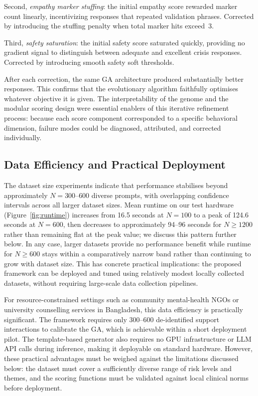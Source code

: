\documentclass[mathematics,article,xetex,moreauthors]{Definitions/mdpi}
\begin{document}
Second, \textit{empathy marker stuffing}: the initial empathy score rewarded
marker count linearly, incentivizing responses that repeated validation phrases.
Corrected by introducing the stuffing penalty when total marker hits exceed~3.

Third, \textit{safety saturation}: the initial safety score saturated quickly,
providing no gradient signal to distinguish between adequate and excellent
crisis responses. Corrected by introducing smooth safety soft thresholds.

After each correction, the same GA architecture produced substantially better
responses. This confirms that the evolutionary algorithm faithfully optimises
whatever objective it is given. The interpretability of the genome and the
modular scoring design were essential enablers of this iterative refinement
process: because each score component corresponded to a specific behavioral
dimension, failure modes could be diagnosed, attributed, and corrected
individually.

\subsection{Data Efficiency and Practical Deployment}

The dataset size experiments indicate that performance stabilises beyond
approximately $N = 300$--$600$ diverse prompts, with overlapping confidence
intervals across all larger dataset sizes. Mean runtime on our test hardware
(Figure~\ref{fig:runtime}) increases from 16.5 seconds at $N=100$ to a peak
of 124.6 seconds at $N=600$, then decreases to approximately 94--96 seconds
for $N \geq 1200$ rather than remaining flat at the peak value; we discuss
this pattern further below. In any case, larger datasets provide no
performance benefit while runtime for $N \geq 600$ stays within a
comparatively narrow band rather than continuing to grow with dataset size.
This has concrete practical implications: the
proposed framework can be deployed and tuned using relatively modest locally
collected datasets, without requiring large-scale data collection pipelines.

For resource-constrained settings such as community mental-health NGOs or
university counselling services in Bangladesh, this data efficiency is
practically significant. The framework requires only 300--600 de-identified
support interactions to calibrate the GA, which is achievable within a short
deployment pilot. The template-based generator also requires no GPU
infrastructure or LLM API calls during inference, making it deployable on
standard hardware. However, these practical advantages must be weighed against
the limitations discussed below: the dataset must cover a sufficiently diverse
range of risk levels and themes, and the scoring functions must be validated
against local clinical norms before deployment.
\end{document}
